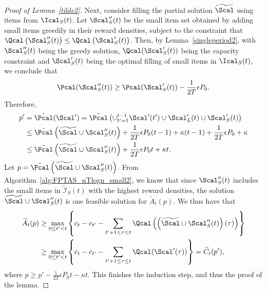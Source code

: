 \begin{proof}[Proof of Lemma~\ref{tilde2}]
	Next, consider filling the partial solution $\widetilde{\Scal}$ using items from $\Ical_S(t)$. Let $\Scal_S''(t)$ be the small item set obtained by adding small items greedily in their reward densities, subject to the constraint that $\Qcal\left(\Scal_S''(t)\right)\le \Qcal\left(\Scal_S'(t)\right)$. Then, by Lemma~\ref{singleperiod2}, with $\Scal_S''(t)$ being the greedy solution, $\Qcal(\Scal_S'(t))$ being the capacity constraint and $\Scal_S'(t)$ being the optimal filling of small items in $\Ical_S(t)$, we conclude that 
	$$
	{\Pcal}({\Scal}_S''(t)) \ge {\Pcal}(\Scal_S'(t)) - \frac{1}{2T}\epsilon P_0.
	$$
	Therefore, 
	\begin{align*}
	p' &= \tilde{\Pcal}(\Scal') = \tilde{\Pcal}\left(\cup_{t'=1}^{t-1}\Scal'(t')\cup \Scal_L'(t)\cup \Scal_S'(t)\right) \\
	&\le \tilde{\Pcal}\left(\widetilde{\Scal}\cup\Scal_S''(t)\right)+\frac{1}{2T}\epsilon P_0(t-1)+\kappa(t-1) +  \frac{1}{2T}\epsilon P_0 + \kappa\\
	&\le \tilde{\Pcal}\left(\widetilde{\Scal}\cup {\Scal}_S''(t)\right) + \frac{1}{2T}\epsilon P_0t + \kappa t.
	\end{align*}
	Let $p=\tilde{\Pcal}\left(\widetilde{\Scal}\cup {\Scal}_S''(t)\right)$. From Algorithm~\ref{alg:FPTAS_nTlogn_small2}, we know that since $\Scal_S''(t)$ includes the small items in $\widetilde{\mathcal{I}}_S(t)$ with the highest reward densities, the solution $\widetilde{\Scal}\cup\Scal_S''(t)$ is one feasible solution for $\widetilde{A}_t(p)$. We thus have that 
	\begin{align*}
	\widetilde{A}_t(p)&\ge \max_{0 \leq t' < t}\left\{ c_t - c_{t'} - \sum_{t'+1 \leq \tau \leq  t} \Qcal\left(\left(\widetilde{\Scal}\cup {\Scal}_S''(t)\right)(\tau)\right) \right\}\\
	&\ge  \max_{0 \leq t' < t}\left\{ c_t - c_{t'} - \sum_{t'+1 \leq \tau \leq  t} \Qcal(\Scal'(\tau)) \right\}=\widetilde{C}_t(p'),
	\end{align*}
	where $p\ge p'-\frac{1}{2T}\epsilon P_0t-\kappa t$. This finishes the induction step, and thus the proof of the lemma.
\end{proof}


